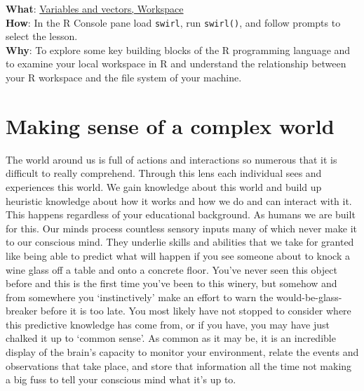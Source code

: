 \documentclass[
  letterpaper,
]{latex/krantz}
\begin{document}
\begin{tcolorbox}[enhanced jigsaw, opacitybacktitle=0.6, breakable, colframe=quarto-callout-tip-color-frame, arc=.35mm, left=2mm, leftrule=.75mm, title=\textcolor{quarto-callout-tip-color}{\faLightbulb}\hspace{0.5em}{Swirl}, opacityback=0, colback=white, toptitle=1mm, rightrule=.15mm, titlerule=0mm, bottomtitle=1mm, bottomrule=.15mm, coltitle=black, colbacktitle=quarto-callout-tip-color!10!white, toprule=.15mm]
\textbf{What}: \href{https://github.com/lin380/swirl}{Variables and
vectors, Workspace}\\
\textbf{How}: In the R Console pane load \texttt{swirl}, run
\texttt{swirl()}, and follow prompts to select the lesson.\\
\textbf{Why}: To explore some key building blocks of the R programming
language and to examine your local workspace in R and understand the
relationship between your R workspace and the file system of your
machine.
\end{tcolorbox}

\hypertarget{making-sense-of-a-complex-world}{%
\section{Making sense of a complex
world}\label{making-sense-of-a-complex-world}}

The world around us is full of actions and interactions so numerous that
it is difficult to really comprehend. Through this lens each individual
sees and experiences this world. We gain knowledge about this world and
build up heuristic knowledge about how it works and how we do and can
interact with it. This happens regardless of your educational
background. As humans we are built for this. Our minds process countless
sensory inputs many of which never make it to our conscious mind. They
underlie skills and abilities that we take for granted like being able
to predict what will happen if you see someone about to knock a wine
glass off a table and onto a concrete floor. You've never seen this
object before and this is the first time you've been to this winery, but
somehow and from somewhere you `instinctively' make an effort to warn
the would-be-glass-breaker before it is too late. You most likely have
not stopped to consider where this predictive knowledge has come from,
or if you have, you may have just chalked it up to `common sense'. As
common as it may be, it is an incredible display of the brain's capacity
to monitor your environment, relate the events and observations that
take place, and store that information all the time not making a big
fuss to tell your conscious mind what it's up to.
\end{document}
